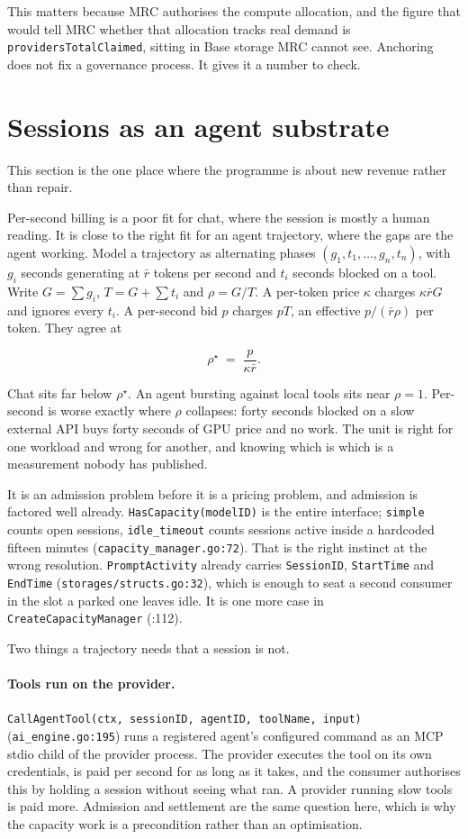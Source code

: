 \documentclass[11pt,a4paper]{article}
\newcommand{\code}[1]{\texttt{\small #1}}
\begin{document}
This matters because MRC authorises the compute allocation, and the figure that
would tell MRC whether that allocation tracks real demand is
\code{providersTotalClaimed}, sitting in Base storage MRC cannot see. Anchoring
does not fix a governance process. It gives it a number to check.

\section{Sessions as an agent substrate}
\label{sec:agents}

This section is the one place where the programme is about new revenue rather
than repair.

Per-second billing is a poor fit for chat, where the session is mostly a human
reading. It is close to the right fit for an agent trajectory, where the gaps
are the agent working. Model a trajectory as alternating phases
$(g_1, t_1, \dots, g_n, t_n)$, with $g_i$ seconds generating at $\bar r$ tokens
per second and $t_i$ seconds blocked on a tool. Write $G = \sum g_i$,
$T = G + \sum t_i$ and $\rho = G/T$. A per-token price $\kappa$ charges
$\kappa \bar r G$ and ignores every $t_i$. A per-second bid $p$ charges $pT$, an
effective $p/(\bar r \rho)$ per token. They agree at

\[
  \rho^{\star} \;=\; \frac{p}{\kappa \bar r}.
\]

\noindent
Chat sits far below $\rho^\star$. An agent bursting against local tools sits
near $\rho = 1$. Per-second is worse exactly where $\rho$ collapses: forty
seconds blocked on a slow external API buys forty seconds of GPU price and no
work. The unit is right for one workload and wrong for another, and knowing
which is which is a measurement nobody has published.

It is an admission problem before it is a pricing problem, and admission is
factored well already. \code{HasCapacity(modelID)} is the entire interface;
\code{simple} counts open sessions, \code{idle\_timeout} counts sessions active
inside a hardcoded fifteen minutes (\code{capacity\_manager.go:72}). That is the
right instinct at the wrong resolution. \code{PromptActivity} already carries
\code{SessionID}, \code{StartTime} and \code{EndTime}
(\code{storages/structs.go:32}), which is enough to seat a second consumer in
the slot a parked one leaves idle. It is one more case in
\code{CreateCapacityManager} (:112).

Two things a trajectory needs that a session is not.

\paragraph{Tools run on the provider.} \code{CallAgentTool(ctx, sessionID,
agentID, toolName, input)} (\code{ai\_engine.go:195}) runs a registered agent's
configured command as an MCP stdio child of the provider process. The provider
executes the tool on its own credentials, is paid per second for as long as it
takes, and the consumer authorises this by holding a session without seeing what
ran. A provider running slow tools is paid more. Admission and settlement are
the same question here, which is why the capacity work is a precondition rather
than an optimisation.
\end{document}
